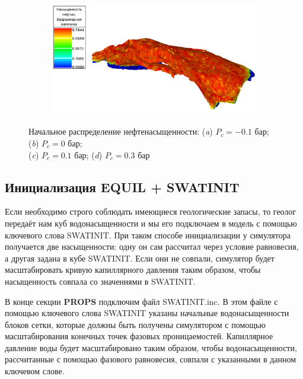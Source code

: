 \documentclass[a4paper,12pt]{article}
\begin{document}
\begin{figure}[H]
\begin{subfigure}[t]{\dimexpr.5\linewidth-1.3em\relax}
\end{subfigure}%
\hfill %
%
\begin{subfigure}[t]{\dimexpr.5\linewidth-1.3em\relax}
	\centering
	\includegraphics[width=.95\linewidth]{saturation_4_model_1}
\end{subfigure}
\captionsetup{justification=centering} %
\caption{Начальное распределение нефтенасыщенности: ({\itshape a}) $P_c=-0.1\text{ бар}$; ({\itshape b}) $P_c=0\text{ бар}$; \\({\itshape c}) $P_c=0.1\text{ бар}$; ({\itshape d}) $P_c=0.3\text{ бар}$} 
\label{fig:initial_saturation}
\end{figure}


\subsection{Инициализация EQUIL + SWATINIT}

Если необходимо строго соблюдать имеющиеся геологические запасы, то геолог передаёт нам куб водонасыщенности и мы его подключаем в модель с помощью ключевого слова SWATINIT.
При таком способе инициализации у симулятора получается две насыщенности: одну он сам рассчитал через условие равновесия, а другая задана в кубе SWATINIT.
Если они не совпали, симулятор будет масштабировать кривую капиллярного давления таким образом, чтобы насыщенность совпала со значениями в SWATINIT. 

В конце секции \textbf{PROPS} подключим файл SWATINIT.inc.
В этом файле с помощью ключевого слова SWATINIT указаны начальные водонасыщенности блоков сетки, которые должны быть получены симулятором с помощью масштабирования конечных точек фазовых проницаемостей.
Капиллярное давление воды будет масштабировано таким образом, чтобы водонасыщенности, рассчитанные с помощью фазового равновесия, совпали с указанными в данном ключевом слове.
\end{document}
